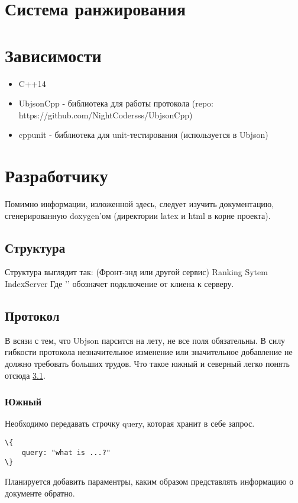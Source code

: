 \documentclass[12pt,a4paper]{article}
\begin{document}
\section{Система ранжирования}



\section{Зависимости}

\begin{itemize}
    \item C++14
    \item UbjsonCpp  - библиотека для работы протокола (repo: https://github.com/NightCodersss/UbjsonCpp)
    \item cppunit - библиотека для unit-тестирования (используется в Ubjson)
\end{itemize}

\section{Разработчику}
Помимно информации, изложенной здесь, следует изучить документацию, сгенерированную doxygen'ом (директории latex и html в корне проекта).

\subsection{Структура}
\label{subsec:generalStructure}
Структура выглядит так:
(Фронт-энд или другой сервис)  Ranking Sytem  IndexServer
Где '\rightarrow' обозначет подключение от клиена к серверу.

\subsection{Протокол}
В всязи с тем, что Ubjson парсится на лету, не все поля обязательны. 
В силу гибкости протокола незначительное изменение или значительное добавление не должно требовать больших трудов.
Что такое южный и северный легко понять отсюда \ref{subsec:generalStructure}.

\subsubsection{Южный}
Необходимо передавать строчку query, которая хранит в себе запрос.
\begin{verbatim}
\{
	query: "what is ...?"
\}
\end{verbatim}
Планируется добавить параментры, каким образом представлять информацию о документе обратно.
\end{document}
